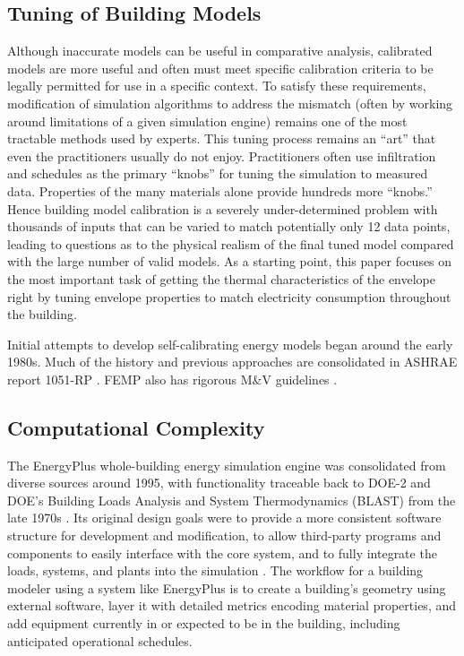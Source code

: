 \documentclass[preprint, review, 12pt]{elsarticle}
\begin{document}
\subsection{Tuning of Building Models}
Although inaccurate models can be useful in comparative analysis, calibrated models are more useful and often must meet specific calibration criteria to be legally permitted for use in a specific context. To satisfy these requirements, modification of simulation algorithms to address the mismatch (often by working around limitations of a given simulation engine) remains one of the most tractable methods used by experts. This tuning process remains an ``art'' that even the practitioners usually do not enjoy. Practitioners often use infiltration and schedules as the primary ``knobs'' for tuning the simulation to measured data. Properties of the many materials alone provide hundreds more ``knobs.'' Hence building model calibration is a severely under-determined problem with thousands of inputs that can be varied to match potentially only 12 data points, leading to questions as to the physical realism of the final tuned model compared with the large number of valid models. As a starting point, this paper focuses on the most important task of getting the thermal characteristics of the envelope right by tuning envelope properties to match electricity consumption throughout the building.

Initial attempts to develop self-calibrating energy models began around the early 1980s. Much of the history and previous approaches are consolidated in ASHRAE report 1051-RP \cite{cit:reddy2006}. FEMP also has rigorous M\&V guidelines \cite{cit:femp2008}.


\subsection{Computational Complexity}
The EnergyPlus whole-building energy simulation engine was consolidated from diverse sources around 1995, with functionality traceable back to DOE-2 and DOE's Building Loads Analysis and System Thermodynamics (BLAST) from the late 1970s \cite{cit:energyplus}. Its original design goals were to provide a more consistent software structure for development and modification, to allow third-party programs and components to easily interface with the core system, and to fully integrate the loads, systems, and plants into the simulation \cite{cit:energyplus}. The workflow for a building modeler using a system like EnergyPlus is to create a building's geometry using external software, layer it with detailed metrics encoding material properties, and add equipment currently in or expected to be in the building, including anticipated operational schedules.
\end{document}
